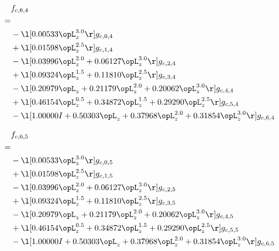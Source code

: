 \begin{alignat}{2} 
\label{eq:f_64_0} 
& f_{c,6,4} \nonumber \\ 
 = \\ 
& - \l[  0.00533 \opL_z^{3.0}  \r] g_{c,0,4} \nonumber \\ 
& + \l[  0.01598 \opL_z^{2.5}  \r] g_{c,1,4} \nonumber \\ 
& - \l[  0.03996 \opL_z^{2.0} +  0.06127 \opL_z^{3.0}  \r] g_{c,2,4} \nonumber \\ 
& + \l[  0.09324 \opL_z^{1.5} +  0.11810 \opL_z^{2.5}  \r] g_{c,3,4} \nonumber \\ 
& - \l[  0.20979 \opL_z +  0.21179 \opL_z^{2.0} +  0.20062 \opL_z^{3.0}  \r] g_{c,4,4} \nonumber \\ 
& + \l[  0.46154 \opL_z^{0.5} +  0.34872 \opL_z^{1.5} +  0.29290 \opL_z^{2.5}  \r] g_{c,5,4} \nonumber \\ 
& - \l[  1.00000 I +  0.50303 \opL_z +  0.37968 \opL_z^{2.0} +  0.31854 \opL_z^{3.0}  \r] g_{c,6,4} \nonumber \\ 
\end{alignat} 


\begin{alignat}{2} 
\label{eq:f_65_0} 
& f_{c,6,5} \nonumber \\ 
 = \\ 
& - \l[  0.00533 \opL_z^{3.0}  \r] g_{c,0,5} \nonumber \\ 
& + \l[  0.01598 \opL_z^{2.5}  \r] g_{c,1,5} \nonumber \\ 
& - \l[  0.03996 \opL_z^{2.0} +  0.06127 \opL_z^{3.0}  \r] g_{c,2,5} \nonumber \\ 
& + \l[  0.09324 \opL_z^{1.5} +  0.11810 \opL_z^{2.5}  \r] g_{c,3,5} \nonumber \\ 
& - \l[  0.20979 \opL_z +  0.21179 \opL_z^{2.0} +  0.20062 \opL_z^{3.0}  \r] g_{c,4,5} \nonumber \\ 
& + \l[  0.46154 \opL_z^{0.5} +  0.34872 \opL_z^{1.5} +  0.29290 \opL_z^{2.5}  \r] g_{c,5,5} \nonumber \\ 
& - \l[  1.00000 I +  0.50303 \opL_z +  0.37968 \opL_z^{2.0} +  0.31854 \opL_z^{3.0}  \r] g_{c,6,5} \nonumber \\ 
\end{alignat} 


